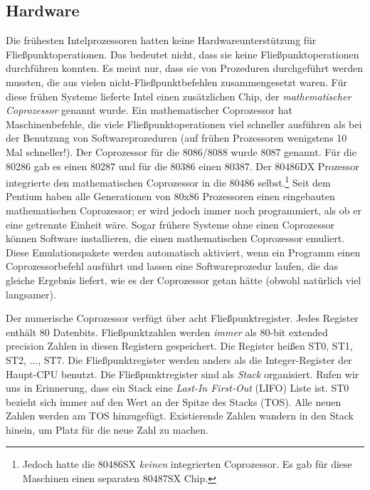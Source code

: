 \subsection{Hardware}
 Die fr\"{u}hesten Intelprozessoren hatten
keine Hardwareunterst\"{u}tzung f\"{u}r Flie{\ss}punktoperationen. Das bedeutet
nicht, dass sie keine Flie{\ss}punktoperationen durchf\"{u}hren konnten. Es
meint nur, dass sie von Prozeduren durchgef\"{u}hrt werden mussten, die
aus vielen nicht-Flie{\ss}punktbefehlen zusammengesetzt waren. F\"{u}r diese
fr\"{u}hen Systeme lieferte Intel einen zus\"{a}tzlichen Chip, der
\emph{mathematischer Coprozessor} genannt wurde. Ein mathematischer
Coprozessor hat Maschinenbefehle, die viele Flie{\ss}punktoperationen
viel schneller ausf\"{u}hren als bei der Benutzung von
Softwareprozeduren (auf fr\"{u}hen Prozessoren wenigstens 10 Mal
schneller!). Der Coprozessor f\"{u}r die 8086/8088 wurde 8087 genannt.
F\"{u}r die 80286 gab es einen 80287 und f\"{u}r die 80386 einen 80387. Der
80486DX Prozessor integrierte den mathematischen Coprozessor in die
80486 selbst.\footnote{Jedoch hatte die 80486SX \emph{keinen}
integrierten Coprozessor. Es gab f\"{u}r diese Maschinen einen separaten
80487SX Chip.} Seit dem Pentium haben alle Generationen von 80x86
Prozessoren einen eingebauten mathematischen Coprozessor; er wird
jedoch immer noch programmiert, als ob er eine getrennte Einheit
w\"{a}re. Sogar fr\"{u}here Systeme ohne einen Coprozessor k\"{o}nnen Software
installieren, die einen mathematischen Coprozessor emuliert. Diese
Emulationspakete werden automatisch aktiviert, wenn ein Programm
einen Coprozessorbefehl ausf\"{u}hrt und lassen eine Softwareprozedur
laufen, die das gleiche Ergebnis liefert, wie es der Coprozessor
getan h\"{a}tte (obwohl nat\"{u}rlich viel langsamer).

Der numerische Coprozessor verf\"{u}gt \"{u}ber acht Flie{\ss}punktregister.
Jedes Register enth\"{a}lt 80 Datenbits. Flie{\ss}punktzahlen werden
\emph{immer} als 80-bit extended precision Zahlen in diesen
Registern gespeichert. Die Register hei{\ss}en {\code ST0}, {\code ST1},
{\code ST2}, $\ldots$, {\code ST7}. Die Flie{\ss}punktregister werden
anders als die Integer-Register der Haupt-CPU benutzt. Die
Flie{\ss}punktregister sind als \emph{Stack} organisiert. Rufen wir uns
in Erinnerung, dass ein Stack eine \emph{Last-In First-Out} (LIFO)
Liste ist. {\code ST0} bezieht sich immer auf den Wert an der Spitze
des Stacks (TOS).  Alle neuen Zahlen
werden am TOS hinzugef\"{u}gt. Existierende Zahlen wandern in den Stack
hinein, um Platz f\"{u}r die neue Zahl zu machen.

